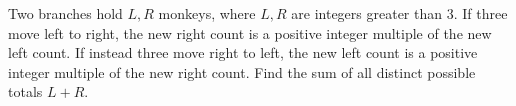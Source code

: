 Two branches hold $L,R$ monkeys, where $L,R$ are integers greater than $3$. If three move left to right, the new right count is a positive integer multiple of the new left count. If instead three move right to left, the new left count is a positive integer multiple of the new right count. Find the sum of all distinct possible totals $L+R$.
